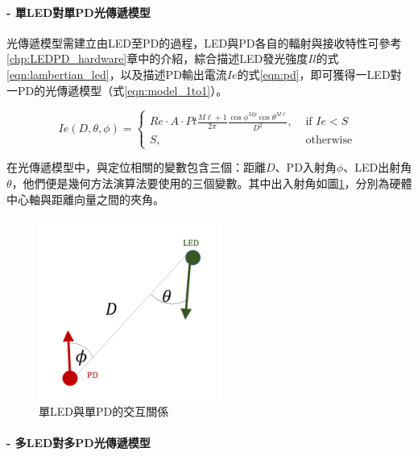     \paragraph*{- 單LED對單PD光傳遞模型}

        \hfill
    
        光傳遞模型需建立由LED至PD的過程，LED與PD各自的輻射與接收特性可參考\ref{chp:LEDPD_hardware}章中的介紹，綜合描述LED發光強度$Il$的式\ref{eqn:lambertian_led}，以及描述PD輸出電流$Ie$的式\ref{eqn:pd}，即可獲得一LED對一PD的光傳遞模型（式\ref{eqn:model_1to1}）。
    
        \begin{equation}
            \label{eqn:model_1to1}
            Ie(D,\theta,\phi) = \begin{cases}Re \cdot A\cdot Pt\frac{M\ell+1}{2\pi}\frac{\cos \phi^{Mp}\cos \theta^{M\ell}}{D^2}, & \text { if } Ie<S \\ S, & \text { otherwise }\end{cases}
        \end{equation}
    
        在光傳遞模型中，與定位相關的變數包含三個：距離$D$、PD入射角$\phi$、LED出射角$\theta$，他們便是幾何方法演算法要使用的三個變數。其中出入射角如圖\ref{pic:interactive_1to1}，分別為硬體中心軸與距離向量之間的夾角。
    
        \begin{figure}[htpb]
            \centering
            \includegraphics[width=6cm]{ch2pic/interactive_1to1.png}
            \caption{單LED與單PD的交互關係}
            \label{pic:interactive_1to1}
        \end{figure}

        \paragraph*{- 多LED對多PD光傳遞模型}

